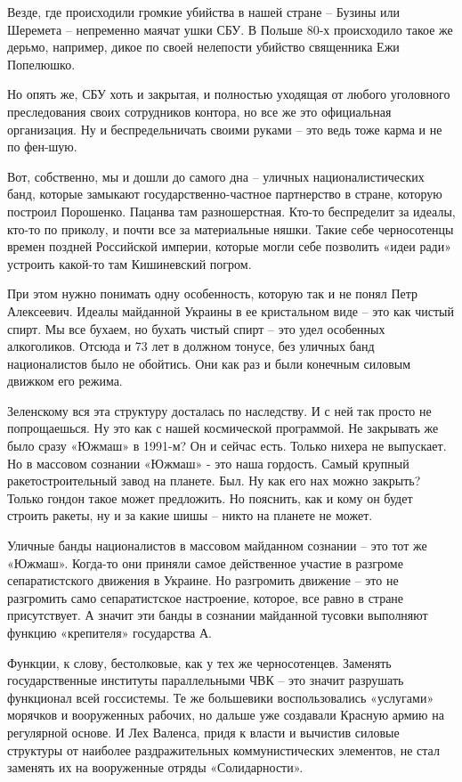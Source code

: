 Везде, где происходили громкие убийства в нашей стране – Бузины или Шеремета –
непременно маячат ушки СБУ. В Польше 80-х происходило такое же дерьмо,
например, дикое по своей нелепости убийство священника Ежи Попелюшко.

Но опять же, СБУ хоть и закрытая, и полностью уходящая от любого уголовного
преследования своих сотрудников контора, но все же это официальная организация.
Ну и беспредельничать своими руками – это ведь тоже карма и не по фен-шую.

Вот, собственно, мы и дошли до самого дна – уличных националистических банд,
которые замыкают государственно-частное партнерство в стране, которую построил
Порошенко. Пацанва там разношерстная. Кто-то беспределит за идеалы, кто-то по
приколу, и почти все за материальные няшки. Такие себе черносотенцы времен
поздней Российской империи, которые могли себе позволить «идеи ради» устроить
какой-то там Кишиневский погром.

При этом нужно понимать одну особенность, которую так и не понял Петр
Алексеевич. Идеалы майданной Украины в ее кристальном виде – это как чистый
спирт. Мы все бухаем, но бухать чистый спирт – это удел особенных алкоголиков.
Отсюда и 73%
лет в должном тонусе, без уличных банд националистов было не обойтись. Они как
раз и были конечным силовым движком его режима.

Зеленскому вся эта структуру досталась по наследству. И с ней так просто не
попрощаешься. Ну это как с нашей космической программой. Не закрывать же было
сразу «Южмаш» в 1991-м? Он и сейчас есть. Только нихера не выпускает. Но в
массовом сознании «Южмаш» - это наша гордость. Самый крупный ракетостроительный
завод на планете. Был. Ну как его нах можно закрыть? Только гондон такое может
предложить. Но пояснить, как и кому он будет строить ракеты, ну и за какие шишы
– никто на планете не может.

Уличные банды националистов в массовом майданном сознании – это тот же «Южмаш».
Когда-то они приняли самое действенное участие в разгроме сепаратистского
движения в Украине. Но разгромить движение – это не разгромить само
сепаратистское настроение, которое, все равно в стране присутствует. А значит
эти банды в сознании майданной тусовки выполняют функцию «крепителя»
государства А.

Функции, к слову, бестолковые, как у тех же черносотенцев. Заменять
государственные институты параллельными ЧВК – это значит разрушать функционал
всей госсистемы. Те же большевики воспользовались «услугами» морячков и
вооруженных рабочих, но дальше уже создавали Красную армию на регулярной
основе. И Лех Валенса, придя к власти и вычистив силовые структуры от наиболее
раздражительных коммунистических элементов, не стал заменять их на вооруженные
отряды «Солидарности».


